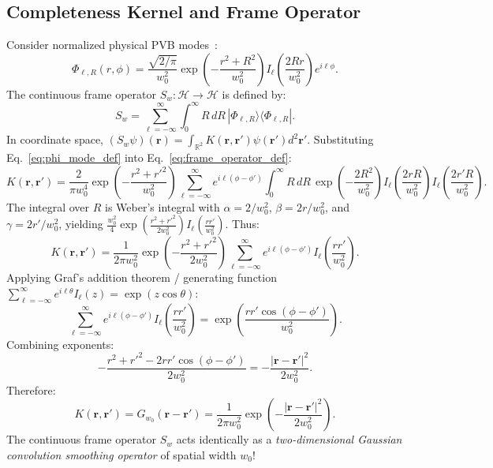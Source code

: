 \documentclass{optica-article}
\begin{document}
\subsection{Completeness Kernel and Frame Operator}

Consider normalized physical PVB modes~\cite{Ferreira2026}:
\begin{equation}
\Phi_{\ell, R}(r, \phi) = \frac{\sqrt{2/\pi}}{w_0^2} \exp\left( - \frac{r^2 + R^2}{w_0^2} \right) I_\ell\left( \frac{2 R r}{w_0^2} \right) e^{i \ell \phi}.
\label{eq:phi_mode_def}
\end{equation}
The continuous frame operator $S_w: \mathcal{H} \to \mathcal{H}$ is defined by:
\begin{equation}
S_w = \sum_{\ell=-\infty}^\infty \int_0^\infty R \, dR \, |\Phi_{\ell, R}\rangle \langle \Phi_{\ell, R}|.
\label{eq:frame_operator_def}
\end{equation}
In coordinate space, $(S_w \psi)(\mathbf{r}) = \int_{\mathbb{R}^2} K(\mathbf{r}, \mathbf{r}') \psi(\mathbf{r}') d^2\mathbf{r}'$. Substituting Eq.~\eqref{eq:phi_mode_def} into Eq.~\eqref{eq:frame_operator_def}:
\begin{equation}
K(\mathbf{r}, \mathbf{r}') = \frac{2}{\pi w_0^4} \exp\left( - \frac{r^2 + r'^2}{w_0^2} \right) \sum_{\ell=-\infty}^\infty e^{i \ell(\phi - \phi')} \int_0^\infty R \, dR \, \exp\left( - \frac{2 R^2}{w_0^2} \right) I_\ell\left( \frac{2 r R}{w_0^2} \right) I_\ell\left( \frac{2 r' R}{w_0^2} \right).
\label{eq:kernel_integral_setup}
\end{equation}
The integral over $R$ is Weber's integral with $\alpha = 2/w_0^2$, $\beta = 2r/w_0^2$, and $\gamma = 2r'/w_0^2$, yielding $\frac{w_0^2}{4} \exp(\frac{r^2 + r'^2}{2w_0^2}) I_\ell(\frac{r r'}{w_0^2})$. Thus:
\begin{equation}
K(\mathbf{r}, \mathbf{r}') = \frac{1}{2\pi w_0^2} \exp\left( - \frac{r^2 + r'^2}{2 w_0^2} \right) \sum_{\ell=-\infty}^\infty e^{i \ell(\phi - \phi')} I_\ell\left( \frac{r r'}{w_0^2} \right).
\label{eq:kernel_after_weber}
\end{equation}
Applying Graf's addition theorem / generating function $\sum_{\ell=-\infty}^\infty e^{i \ell \theta} I_\ell(z) = \exp(z \cos \theta)$:
\begin{equation}
\sum_{\ell=-\infty}^\infty e^{i \ell(\phi - \phi')} I_\ell\left( \frac{r r'}{w_0^2} \right) = \exp\left( \frac{r r' \cos(\phi - \phi')}{w_0^2} \right).
\label{eq:graf_application}
\end{equation}
Combining exponents:
\begin{equation}
- \frac{r^2 + r'^2 - 2 r r' \cos(\phi - \phi')}{2 w_0^2} = - \frac{|\mathbf{r} - \mathbf{r}'|^2}{2 w_0^2}.
\label{eq:coordinate_difference}
\end{equation}
Therefore:
\begin{equation}
\boxed{K(\mathbf{r}, \mathbf{r}') = G_{w_0}(\mathbf{r} - \mathbf{r}') = \frac{1}{2\pi w_0^2} \exp\left( - \frac{|\mathbf{r} - \mathbf{r}'|^2}{2 w_0^2} \right).}
\label{eq:gaussian_kernel}
\end{equation}
The continuous frame operator $S_w$ acts identically as a \emph{two-dimensional Gaussian convolution smoothing operator} of spatial width $w_0$!
\end{document}
